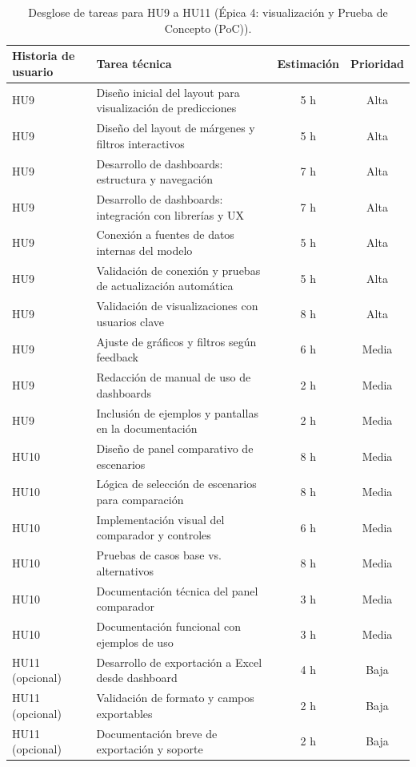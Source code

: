 \documentclass[
11pt, %
]{charter}
\begin{document}
\begin{table}[H]
\centering
\begin{tabular}{|l|p{6cm}|c|c|}
\hline
\textbf{Historia de usuario} & \textbf{Tarea técnica} & \textbf{Estimación} & \textbf{Prioridad} \\
\hline
HU9 & Diseño inicial del layout para visualización de predicciones & 5 h & Alta \\
HU9 & Diseño del layout de márgenes y filtros interactivos & 5 h & Alta \\
HU9 & Desarrollo de dashboards: estructura y navegación & 7 h & Alta \\
HU9 & Desarrollo de dashboards: integración con librerías y UX & 7 h & Alta \\
HU9 & Conexión a fuentes de datos internas del modelo & 5 h & Alta \\
HU9 & Validación de conexión y pruebas de actualización automática & 5 h & Alta \\
HU9 & Validación de visualizaciones con usuarios clave & 8 h & Alta \\
HU9 & Ajuste de gráficos y filtros según feedback & 6 h & Media \\
HU9 & Redacción de manual de uso de dashboards & 2 h & Media \\
HU9 & Inclusión de ejemplos y pantallas en la documentación & 2 h & Media \\
\hline
HU10 & Diseño de panel comparativo de escenarios & 8 h & Media \\
HU10 & Lógica de selección de escenarios para comparación & 8 h & Media \\
HU10 & Implementación visual del comparador y controles & 6 h & Media \\
HU10 & Pruebas de casos base vs. alternativos & 8 h & Media \\
HU10 & Documentación técnica del panel comparador & 3 h & Media \\
HU10 & Documentación funcional con ejemplos de uso & 3 h & Media \\
\hline
HU11 (opcional) & Desarrollo de exportación a Excel desde dashboard & 4 h & Baja \\
HU11 (opcional) & Validación de formato y campos exportables & 2 h & Baja \\
HU11 (opcional) & Documentación breve de exportación y soporte & 2 h & Baja \\
\hline
\end{tabular}
\caption{Desglose de tareas para HU9 a HU11 (Épica 4: visualización y Prueba de Concepto (PoC)).}
\end{table}
\end{document}
